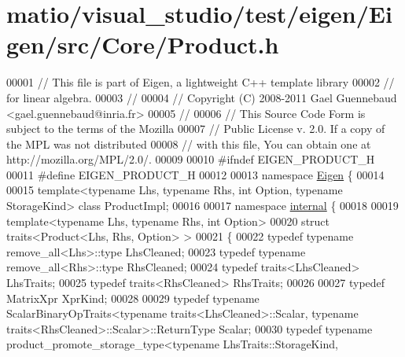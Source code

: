 \hypertarget{matio_2visual__studio_2test_2eigen_2_eigen_2src_2_core_2_product_8h_source}{}\section{matio/visual\+\_\+studio/test/eigen/\+Eigen/src/\+Core/\+Product.h}
\label{matio_2visual__studio_2test_2eigen_2_eigen_2src_2_core_2_product_8h_source}

\begin{DoxyCode}
00001 \textcolor{comment}{// This file is part of Eigen, a lightweight C++ template library}
00002 \textcolor{comment}{// for linear algebra.}
00003 \textcolor{comment}{//}
00004 \textcolor{comment}{// Copyright (C) 2008-2011 Gael Guennebaud <gael.guennebaud@inria.fr>}
00005 \textcolor{comment}{//}
00006 \textcolor{comment}{// This Source Code Form is subject to the terms of the Mozilla}
00007 \textcolor{comment}{// Public License v. 2.0. If a copy of the MPL was not distributed}
00008 \textcolor{comment}{// with this file, You can obtain one at http://mozilla.org/MPL/2.0/.}
00009 
00010 \textcolor{preprocessor}{#ifndef EIGEN\_PRODUCT\_H}
00011 \textcolor{preprocessor}{#define EIGEN\_PRODUCT\_H}
00012 
00013 \textcolor{keyword}{namespace }\hyperlink{namespace_eigen}{Eigen} \{
00014 
00015 \textcolor{keyword}{template}<\textcolor{keyword}{typename} Lhs, \textcolor{keyword}{typename} Rhs, \textcolor{keywordtype}{int} Option, \textcolor{keyword}{typename} StorageKind> \textcolor{keyword}{class }ProductImpl;
00016 
00017 \textcolor{keyword}{namespace }\hyperlink{namespaceinternal}{internal} \{
00018 
00019 \textcolor{keyword}{template}<\textcolor{keyword}{typename} Lhs, \textcolor{keyword}{typename} Rhs, \textcolor{keywordtype}{int} Option>
00020 \textcolor{keyword}{struct }traits<Product<Lhs, Rhs, Option> >
00021 \{
00022   \textcolor{keyword}{typedef} \textcolor{keyword}{typename} remove\_all<Lhs>::type LhsCleaned;
00023   \textcolor{keyword}{typedef} \textcolor{keyword}{typename} remove\_all<Rhs>::type RhsCleaned;
00024   \textcolor{keyword}{typedef} traits<LhsCleaned> LhsTraits;
00025   \textcolor{keyword}{typedef} traits<RhsCleaned> RhsTraits;
00026   
00027   \textcolor{keyword}{typedef} MatrixXpr XprKind;
00028   
00029   \textcolor{keyword}{typedef} \textcolor{keyword}{typename} ScalarBinaryOpTraits<typename traits<LhsCleaned>::Scalar, \textcolor{keyword}{typename} 
      traits<RhsCleaned>::Scalar>::ReturnType Scalar;
00030   \textcolor{keyword}{typedef} \textcolor{keyword}{typename} product\_promote\_storage\_type<\textcolor{keyword}{typename} LhsTraits::StorageKind,

\end{DoxyCode}

